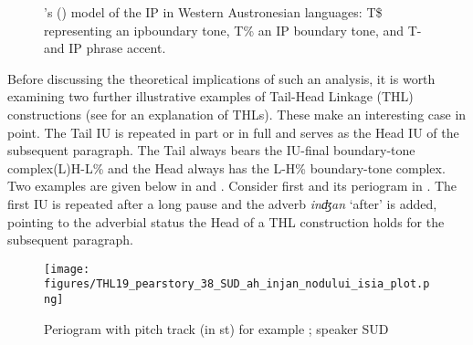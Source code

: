 \begin{figure}[h]
	\caption{ \citeauthor{Himmelmann_Preliminary_2018}'s (\citeyear[360]{Himmelmann_Preliminary_2018}) model of the IP in Western Austronesian languages: T\$ representing an ipboundary tone, T\% an IP boundary tone, and T- and IP phrase accent.}
	\label{Himmelmann_ip}
\end{figure}



Before discussing the theoretical implications of such an analysis, it is worth examining two further illustrative examples of Tail-Head Linkage (THL) constructions (see   for an explanation of THLs). These make an interesting case in point. The Tail IU is repeated in part or in full and serves as the Head IU of the subsequent paragraph. The Tail always bears the IU-final boundary-tone complex(L)H-L\%  and the Head always has the L-H\% boundary-tone complex. Two examples are given below in  and . Consider first  and its periogram in  . The first IU is repeated after a long pause and the adverb \textit{inʤan} ‘after’ is added, pointing to the adverbial status the Head of a THL construction holds for the subsequent paragraph.




\begin{figure}
	\texttt{[image: figures/THL19\_pearstory\_38\_SUD\_ah\_injan\_nodului\_isia\_plot.png]}
	\caption{Periogram with pitch track (in st) for example ; speaker SUD}
	\label{pitch:THL2}
\end{figure}

